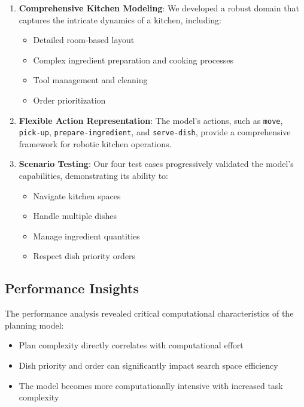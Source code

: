 \documentclass{article}
\begin{document}
\begin{enumerate}
    \item \textbf{Comprehensive Kitchen Modeling}: We developed a robust domain that captures the intricate dynamics of a kitchen, including:
    \begin{itemize}
        \item Detailed room-based layout
        \item Complex ingredient preparation and cooking processes
        \item Tool management and cleaning
        \item Order prioritization
    \end{itemize}

    \item \textbf{Flexible Action Representation}: The model's actions, such as \texttt{move}, \texttt{pick-up}, \texttt{prepare-ingredient}, and \texttt{serve-dish}, provide a comprehensive framework for robotic kitchen operations.

    \item \textbf{Scenario Testing}: Our four test cases progressively validated the model's capabilities, demonstrating its ability to:
    \begin{itemize}
        \item Navigate kitchen spaces
        \item Handle multiple dishes
        \item Manage ingredient quantities
        \item Respect dish priority orders
    \end{itemize}
\end{enumerate}

\subsection{Performance Insights}

The performance analysis revealed critical computational characteristics of the planning model:
\begin{itemize}
    \item Plan complexity directly correlates with computational effort
    \item Dish priority and order can significantly impact search space efficiency
    \item The model becomes more computationally intensive with increased task complexity
\end{itemize}
\end{document}
